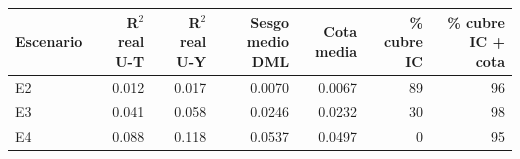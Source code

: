 \begin{tabular}{lrrrrrr}
\toprule
Escenario & R$^2$ real U-T & R$^2$ real U-Y & Sesgo medio DML & Cota media & \% cubre IC & \% cubre IC + cota \\
\midrule
E2 & 0.012 & 0.017 & 0.0070 & 0.0067 & 89 & 96 \\
E3 & 0.041 & 0.058 & 0.0246 & 0.0232 & 30 & 98 \\
E4 & 0.088 & 0.118 & 0.0537 & 0.0497 & 0 & 95 \\
\bottomrule
\end{tabular}